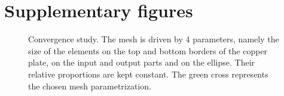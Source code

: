 \documentclass[]{article}
\begin{document}
\pagebreak

\section{Supplementary figures}

\begin{figure}[h]
    \centering
    
    \caption{
        Convergence study.
        The mesh is driven by 4 parameters, namely the size of the elements on the top and bottom borders of the copper plate,
        on the input and output parts and on the ellipse.
        Their relative proportions are kept constant.
        The \textcolor{darkpastelgreen}{green cross} represents the chosen mesh parametrization.
    }
    \label{figure:mesh-convergence}
\end{figure}


\end{document}
